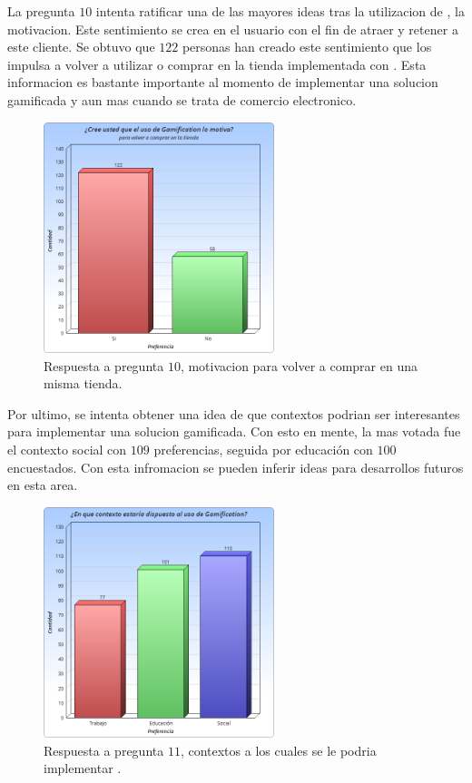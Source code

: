 La pregunta $10$ intenta ratificar una de las mayores ideas tras la utilizacion de {\GAM},
la motivacion. Este sentimiento se crea en el usuario con el fin de atraer y retener a este cliente.
 Se obtuvo que $122$ personas han creado este sentimiento que los impulsa a volver a utilizar o comprar 
en la tienda implementada con {\GAM}. Esta informacion es bastante importante al momento de implementar
una solucion gamificada y aun mas cuando se trata de comercio electronico.

\begin{figure}[!htb]
  \centering
  \includegraphics[width=0.6\textwidth]{images/Graficos/graf_5_11.png}
  \caption[chart5.11]{Respuesta a pregunta $10$, motivacion para volver a comprar en una misma tienda.}
  \label{fig:chart5.11}
\end{figure}

Por ultimo, se intenta obtener una idea de que contextos podrian ser interesantes para implementar una
solucion gamificada. Con esto en mente, la mas votada fue el contexto social con $109$ preferencias, 
seguida por educación con $100$ encuestados. Con esta infromacion se pueden inferir ideas para 
desarrollos futuros en esta area.

\begin{figure}[!htb]
  \centering
  \includegraphics[width=0.6\textwidth]{images/Graficos/graf_5_12.png}
  \caption[chart5.12]{Respuesta a pregunta $11$, contextos a los cuales se le podria implementar {\GAM}.}
  \label{fig:chart5.12}
\end{figure}


